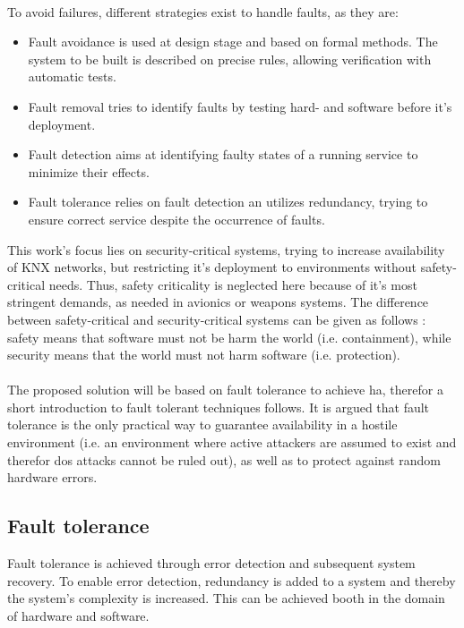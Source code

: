 \\
To avoid failures, different strategies exist to handle faults, as they are:
\begin{itemize}
 \item Fault avoidance is used at design stage and based on formal methods. The system to be built is described on precise rules, allowing verification with 
 automatic tests.
 \item Fault removal tries to identify faults by testing hard- and software before it's deployment.
 \item Fault detection aims at identifying faulty states of a running service to minimize their effects.
 \item Fault tolerance relies on fault detection an utilizes redundancy, trying to ensure correct service despite the occurrence of faults. 
\end{itemize}
This work's focus lies on security-critical systems, trying to increase availability of KNX networks, but restricting it's
deployment to environments without safety-critical needs. Thus, safety criticality is neglected here because of it's most stringent demands, as needed in
avionics or weapons systems.
The difference between safety-critical and security-critical systems can be given as follows \cite{5784222}: safety means that software must not be harm the 
world (i.e. containment), while security means that the world must not harm software (i.e. protection). 
\\
\\
The proposed solution will be based on fault tolerance to achieve \gls{ha}, therefor a short introduction to fault tolerant techniques follows.
It is argued that fault tolerance is the only practical way to guarantee availability
in a hostile environment (i.e. an environment where active attackers are assumed to exist and therefor \gls{dos} attacks cannot be ruled out), as well as to
protect against random hardware errors.

\subsection{Fault tolerance}
Fault tolerance is achieved through error detection and subsequent system recovery. To enable error detection, redundancy is added to a system and thereby the 
system's complexity is increased. This can be achieved booth in the domain of hardware
and software.

